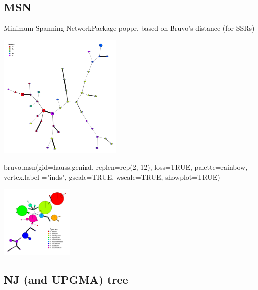 \documentclass[compress, ucs, xelatex, 11pt, xcolor=svgnames,
  hyperref={
    bookmarks=true,
    unicode=true,
    colorlinks=true,
    pdftitle={Molecular data in R},
    plainpages=false,
    pdfauthor={Vojtech Zeisek},
    pdfsubject={Course about phylogeny and evolution in R},
    pdfcreator={XeLaTeX},
    pdfkeywords={R, evolution, phylogeny, molecular data},
    linkcolor=Tomato,
    anchorcolor=SaddleBrown,
    citecolor=Goldenrod,
    filecolor=DarkMagenta,
    menucolor=Sienna,
    urlcolor=DarkTurquoise,
    pdftex},
  url={hyphens, lowtilde} %
  ]{beamer}
\begin{document}
\subsection{MSN}

\begin{frame}[fragile]{Minimum Spanning Network}{Package poppr, based on Bruvo's distance (for SSRs)}
\begin{multicols}{2}
  \includegraphics[height=6cm]{msn.png}
  \columnbreak
  \begin{spluscode}
    bruvo.msn(gid=hauss.genind,
      replen=rep(2, 12), loss=TRUE,
      palette=rainbow, vertex.label
      ="inds", gscale=TRUE,
      wscale=TRUE, showplot=TRUE)
  \end{spluscode}
  \begin{center}
    \includegraphics[width=3.5cm]{msn-bruvo_no_labels.png}
  \end{center}
\end{multicols}
\end{frame}

\subsection{NJ (and UPGMA) tree}
\end{document}
